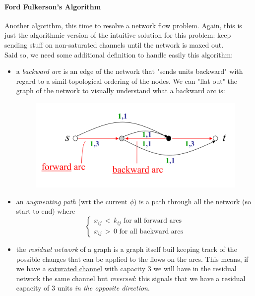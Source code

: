             \paragraph{Ford Fulkerson's Algorithm}
                Another algorithm, this time to resolve a network flow problem. Again, this is just the algorithmic version of the intuitive solution for this problem: keep sending stuff on non-saturated channels until the network is maxed out.\\
                Said so, we need some additional definition to handle easily this algorithm:
                \begin{itemize}
                    \item a \textit{backward arc} is an edge of the network that "sends units backward" with regard to a simil-topological ordering of the nodes. We can "flat out" the graph of the network to visually understand what a backward arc is:
                        \begin{figure}[H]
                            \centering
                            \includegraphics[width = \textwidth]{./images/BackwardArcs.png}
                        \end{figure}
                    \item an \textit{augmenting path} (wrt the current $\phi$) is a path through all the network (so start to end) where
                        \begin{equation} 
                            \begin{cases}
                                x_{ij}\, <\, k_{ij} \text{ for all forward arcs}\\
                                x_{ij}\, >\, 0 \text{ for all backward arcs}
                            \end{cases}
                        \end{equation}
                    \item the \textit{residual network} of a graph is a graph itself buil keeping track of the possible changes that can be applied to the flows on the arcs. This means, if we have a \underline{saturated channel} with capacity 3 we will have in the residual network the same channel but \textit{reversed}: this signals that we have a residual capacity of 3 units \textit{in the opposite direction}.

\end{itemize}
